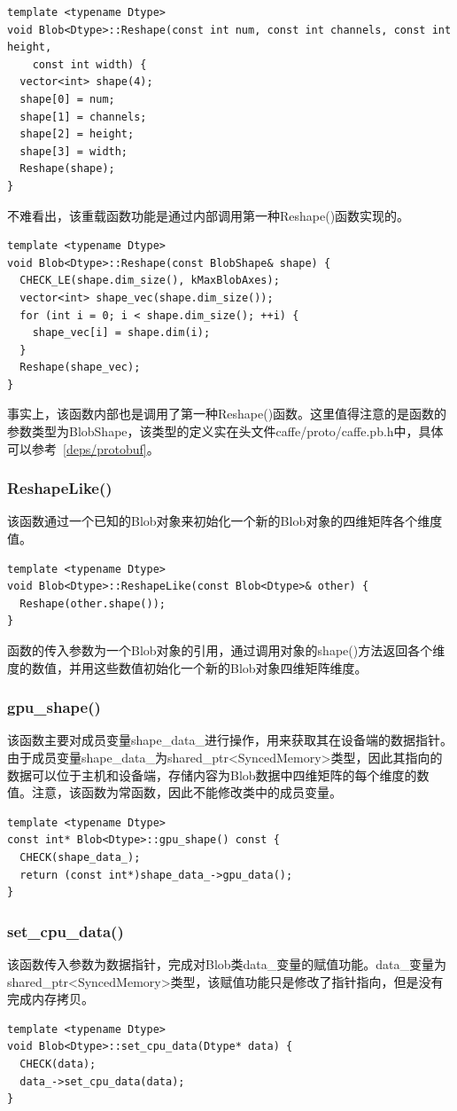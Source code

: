 \noindent{}
\begin{verbatim}
template <typename Dtype>
void Blob<Dtype>::Reshape(const int num, const int channels, const int height,
    const int width) {
  vector<int> shape(4);
  shape[0] = num;
  shape[1] = channels;
  shape[2] = height;
  shape[3] = width;
  Reshape(shape);
}
\end{verbatim}
不难看出，该重载函数功能是通过内部调用第一种Reshape()函数实现的。\\

\noindent{}
\begin{verbatim}
template <typename Dtype>
void Blob<Dtype>::Reshape(const BlobShape& shape) {
  CHECK_LE(shape.dim_size(), kMaxBlobAxes);
  vector<int> shape_vec(shape.dim_size());
  for (int i = 0; i < shape.dim_size(); ++i) {
    shape_vec[i] = shape.dim(i);
  }
  Reshape(shape_vec);
}
\end{verbatim}
事实上，该函数内部也是调用了第一种Reshape()函数。这里值得注意的是函数的参数类型为BlobShape，该类型的定义实在头文件caffe/proto/caffe.pb.h中，具体可以参考~\ref{deps/protobuf}。
\subsubsection{ReshapeLike()}
该函数通过一个已知的Blob对象来初始化一个新的Blob对象的四维矩阵各个维度值。
\begin{verbatim}
template <typename Dtype>
void Blob<Dtype>::ReshapeLike(const Blob<Dtype>& other) {
  Reshape(other.shape());
}
\end{verbatim}
函数的传入参数为一个Blob对象的引用，通过调用对象的shape()方法返回各个维度的数值，并用这些数值初始化一个新的Blob对象四维矩阵维度。
\subsubsection{gpu\_shape()}
该函数主要对成员变量shape\_data\_进行操作，用来获取其在设备端的数据指针。由于成员变量shape\_data\_为shared\_ptr<SyncedMemory>类型，因此其指向的数据可以位于主机和设备端，存储内容为Blob数据中四维矩阵的每个维度的数值。注意，该函数为常函数，因此不能修改类中的成员变量。
\begin{verbatim}
template <typename Dtype>
const int* Blob<Dtype>::gpu_shape() const {
  CHECK(shape_data_);
  return (const int*)shape_data_->gpu_data();
}
\end{verbatim}
\subsubsection{set\_cpu\_data()}
该函数传入参数为数据指针，完成对Blob类data\_变量的赋值功能。data\_变量为shared\_ptr<SyncedMemory>类型，该赋值功能只是修改了指针指向，但是没有完成内存拷贝。
\begin{verbatim}
template <typename Dtype>
void Blob<Dtype>::set_cpu_data(Dtype* data) {
  CHECK(data);
  data_->set_cpu_data(data);
}
\end{verbatim}
